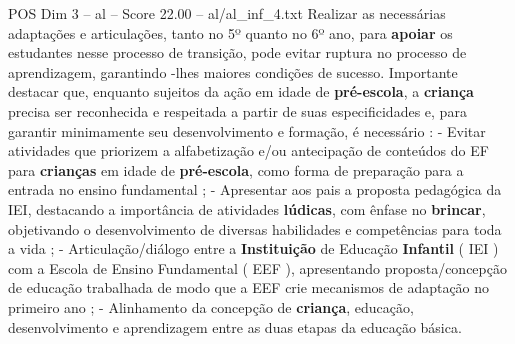 \begin{textsample}{POS Dim 3 – al – Score 22.00 – al/al\_inf\_4.txt}
Realizar as necessárias adaptações e articulações, tanto no 5º quanto no 6º ano, para \textbf{apoiar} os estudantes nesse processo de transição, pode evitar ruptura no processo de aprendizagem, garantindo -lhes maiores condições de sucesso.
Importante destacar que, enquanto sujeitos da ação em idade de \textbf{pré-escola}, a \textbf{criança} precisa ser reconhecida e respeitada a partir de suas especificidades e, para garantir minimamente seu desenvolvimento e formação, é necessário : - Evitar atividades que priorizem a alfabetização e/ou antecipação de conteúdos do EF para \textbf{crianças} em idade de \textbf{pré-escola}, como forma de preparação para a entrada no ensino fundamental ; - Apresentar aos pais a proposta pedagógica da IEI, destacando a importância de atividades \textbf{lúdicas}, com ênfase no \textbf{brincar}, objetivando o desenvolvimento de diversas habilidades e competências para toda a vida ; - Articulação/diálogo entre a \textbf{Instituição} de Educação \textbf{Infantil} ( IEI ) com a Escola de Ensino Fundamental ( EEF ), apresentando proposta/concepção de educação trabalhada de modo que a EEF crie mecanismos de adaptação no primeiro ano ; - Alinhamento da concepção de \textbf{criança}, educação, desenvolvimento e aprendizagem entre as duas etapas da educação básica.

\end{textsample}
